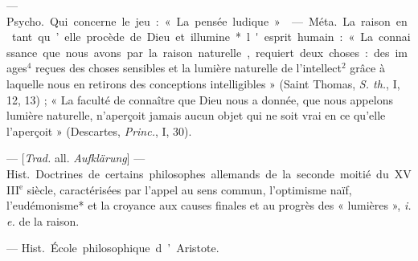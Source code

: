 \begin{itemize}[leftmargin=1cm, label=, itemsep=1pt]
 — \si{Psycho.} Qui concerne le jeu : « La pensée ludique ».

 — \si{Méta.} La raison en tant qu’elle procède de Dieu
et illumine* l'esprit humain : « La connaissance que nous avons par la raison
naturelle, requiert deux choses : des images$^4$ reçues des choses sensibles
et la lumière naturelle de l’intellect$^2$ grâce à laquelle nous en retirons
des conceptions intelligibles » (Saint Thomas, {\it S. th.}, I, 12, 13) ;
« La faculté de connaître que Dieu nous a donnée, que nous appelons lumière
naturelle, n'aperçoit jamais aucun objet qui ne soit vrai en ce qu’elle
l'aperçoit » (Descartes, {\it Princ.}, I, 30).

 — [{\it Trad.} all. {\it Aufklärung}] —
\si{Hist.} Doctrines de certains philosophes allemands de la seconde moitié
du {\footnotesize XVIII}$^\text{e}$ siècle, caractérisées par l'appel au sens
commun, l'optimisme naïf, l’eudémonisme* et la croyance aux causes finales et
au progrès des « lumières », {\it i. e.} de la raison.

 — \si{Hist.} École philosophique d’Aristote.

	\end{itemize}
